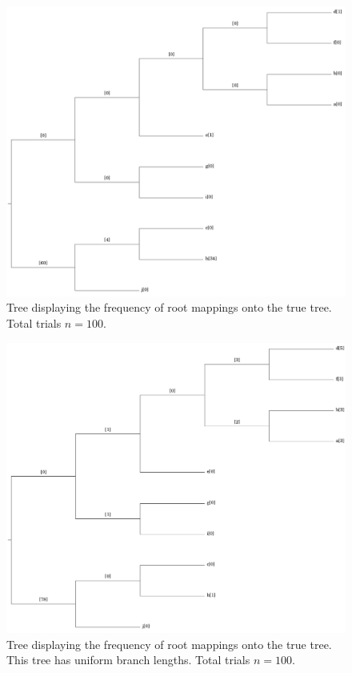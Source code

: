 \documentclass{article}
\begin{document}
\begin{figure}
  \includegraphics[width=.9\linewidth]{figs/random_tree_6400_sites.png}
  \caption{Tree displaying the frequency of root mappings onto the true tree.
  Total trials $n=100$.}
  \label{fig:mapped_tree}
\end{figure}

\begin{figure}
  \includegraphics[width=.9\linewidth]{figs/uniform_tree_6400_sites.png}
  \caption{Tree displaying the frequency of root mappings onto the true tree.
    This tree has uniform branch lengths. Total trials $n=100$.}
  \label{fig:mapped_uniform_tree}
\end{figure}
\end{document}
